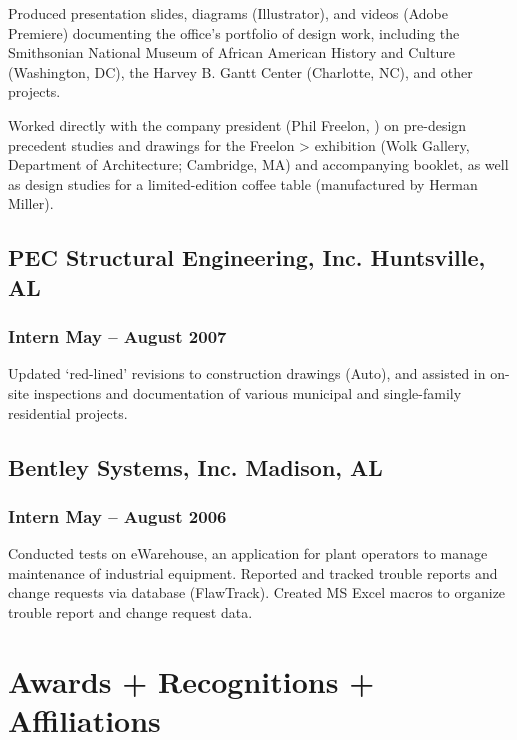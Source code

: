\documentclass[letterpaper, oneside, 10pt]{article}
\begin{document}
Produced presentation slides, diagrams (Illustrator), and videos (Adobe
Premiere) documenting the office’s portfolio of design work, including the
Smithsonian National Museum of African American History and Culture
(Washington, DC), the Harvey B. Gantt Center (Charlotte, NC), and
other projects.

Worked directly with the company president (Phil Freelon, ) on
pre-design precedent studies and drawings for the Freelon > 
exhibition (Wolk Gallery,  Department of Architecture; Cambridge, MA)
and accompanying booklet, as well as design studies for a limited-edition
coffee table (manufactured by Herman Miller).


\subsection*{PEC Structural Engineering, Inc.\DotSep{0.25em} Huntsville, AL}

\subsubsection*{Intern\DotSep{0.25em} May -- August 2007}

Updated `red-lined' revisions to construction drawings (Auto), and
assisted in on-site inspections and documentation of various municipal and
single-family residential projects.

\subsection*{Bentley Systems, Inc.\DotSep{0.25em} Madison, AL}

\subsubsection*{Intern\DotSep{0.25em} May -- August 2006}

Conducted tests on eWarehouse, an application for plant operators to manage
maintenance of industrial equipment. Reported and tracked trouble reports and
change requests via database (FlawTrack). Created MS Excel macros to organize
trouble report and change request data.

\suppresstrue


\section*{Awards + Recognitions + Affiliations} %
\end{document}
